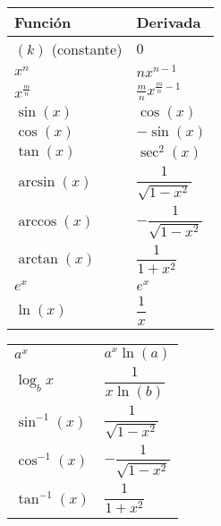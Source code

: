 \documentclass[answers]{exam} %
\begin{document}
\begin{questions}
\begin{center}
        \noindent
        \begin{minipage}{0.5\textwidth}
            \centering
            \begin{tabular}{|>{\centering\arraybackslash}m{3.5cm}|>{\centering\arraybackslash}m{3cm}|}
                \hline
                Función           & Derivada                       \\
                \hline
                $(k)$ (constante) & $0$                            \\
                $x^n$             & $nx^{n-1}$                     \\
                $x^\frac{m}{n}$   & $\frac{m}{n}x^{\frac{m}{n}-1}$ \\
                $\sin(x)$         & $\cos(x)$                      \\
                $\cos(x)$         & $-\sin(x)$                     \\
                $\tan(x)$         & $\sec^2(x)$                    \\
                $\arcsin(x)$      & $\dfrac{1}{\sqrt{1-x^2}}$      \\
                $\arccos(x)$      & $-\dfrac{1}{\sqrt{1-x^2}}$     \\
                $\arctan(x)$      & $\dfrac{1}{1+x^2}$             \\
                $e^x$             & $e^x$                          \\
                $\ln(x)$          & $\dfrac{1}{x}$                 \\[10px]
                \hline
            \end{tabular}
        \end{minipage}%
        \begin{minipage}{0.5\textwidth}
            \centering
            \begin{tabular}{|>{\centering\arraybackslash}m{3.5cm}|>{\centering\arraybackslash}m{3cm}|}
                \hline
                $a^x$              & $a^x \ln(a)$                    \\
                $\log_b{x}$        & $\dfrac{1}{x \ln(b)}$           \\
                $\sin^{-1}(x)$     & $\dfrac{1}{\sqrt{1-x^2}}$       \\
                $\cos^{-1}(x)$     & $-\dfrac{1}{\sqrt{1-x^2}}$      \\
                $\tan^{-1}(x)$     & $\dfrac{1}{1+x^2}$              \\

\end{tabular}
\end{minipage}
\end{center}
\end{questions}
\end{document}
